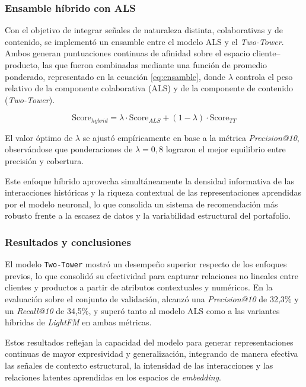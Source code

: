 \subsubsection{Ensamble híbrido con ALS}

Con el objetivo de integrar señales de naturaleza distinta, colaborativas y de contenido, se implementó un ensamble entre el modelo ALS y el \textit{Two-Tower}.  
Ambos generan puntuaciones continuas de afinidad sobre el espacio cliente–producto, las que fueron combinadas mediante una función de promedio ponderado, representado en la ecuación \ref{eq:ensamble}, donde $\lambda$ controla el peso relativo de la componente colaborativa (ALS) y de la componente de contenido (\textit{Two-Tower}).

\begin{equation}
\label{eq:ensamble}
\text{Score}_{hybrid} = \lambda \cdot \text{Score}_{ALS} + (1 - \lambda) \cdot \text{Score}_{TT}
\end{equation}
 
El valor óptimo de $\lambda$ se ajustó empíricamente en base a la métrica \textit{Precision@10}, observándose que ponderaciones de \(\lambda = 0{,}8\) lograron el mejor equilibrio entre precisión y cobertura.  

Este enfoque híbrido aprovecha simultáneamente la densidad informativa de las interacciones históricas y la riqueza contextual de las representaciones aprendidas por el modelo neuronal, lo que consolida un sistema de recomendación más robusto frente a la escasez de datos y la variabilidad estructural del portafolio.

\subsubsection{Resultados y conclusiones}

El modelo \texttt{Two-Tower} mostró un desempeño superior respecto de los enfoques previos, lo que consolidó su efectividad para capturar relaciones no lineales entre clientes y productos a partir de atributos contextuales y numéricos.
En la evaluación sobre el conjunto de validación, alcanzó una \textit{Precision@10} de 32{,}3\% y un \textit{Recall@10} de 34{,}5\%, y superó tanto al modelo ALS como a las variantes híbridas de \textit{LightFM} en ambas métricas.

Estos resultados reflejan la capacidad del modelo para generar representaciones continuas de mayor expresividad y generalización, integrando de manera efectiva las señales de contexto estructural, la intensidad de las interacciones y las relaciones latentes aprendidas en los espacios de \textit{embedding}.

